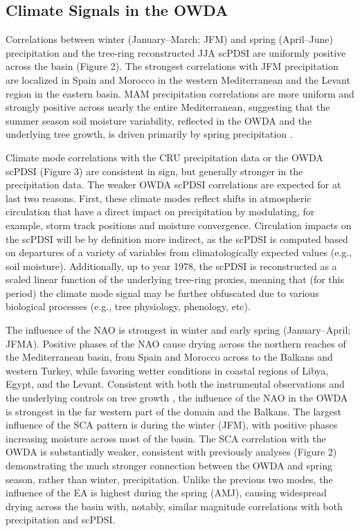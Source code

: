 \documentclass[draft,jgr]{AGUTeX}
\begin{document}
\begin{article}
\subsection{Climate Signals in the OWDA}
\noindent Correlations between winter (January--March; JFM) and spring (April--June) precipitation and the tree-ring reconstructed JJA scPDSI are uniformly positive across the basin (Figure 2). The strongest correlations with JFM precipitation are localized in Spain and Morocco in the western Mediterranean and the Levant region in the eastern basin.  MAM precipitation correlations are more uniform and strongly positive across nearly the entire Mediterranean, suggesting that the summer season soil moisture variability, reflected in the OWDA and the underlying tree growth, is driven primarily by spring precipitation \citep[c.f.][]{Touchan:etal2014a}.

\indent Climate mode correlations with the CRU precipitation data or the OWDA scPDSI (Figure 3) are consistent in sign, but generally stronger in the precipitation data. The weaker OWDA scPDSI correlations are expected for at last two reasons. First, these climate modes reflect shifts in atmospheric circulation that have a direct impact on precipitation by modulating, for example, storm track positions and moisture convergence. Circulation impacts on the scPDSI will be by definition more indirect, as the scPDSI is computed based on departures of a variety of variables from climatologically expected values (e.g., soil moisture). Additionally, up to year 1978, the scPDSI is reconstructed as a scaled linear function of the underlying tree-ring proxies, meaning that (for this period) the climate mode signal may be further obfuscated due to various biological processes (e.g., tree physiology, phenology, etc).

\indent The influence of the NAO is strongest in winter and early spring (January--April; JFMA). Positive phases of the NAO cause drying across the northern reaches of the Mediterranean basin, from Spain and Morocco across to the Balkans and western Turkey, while favoring wetter conditions in coastal regions of Libya, Egypt, and the Levant.  Consistent with both the instrumental observations \citep[e.g.][]{Lamb:etal1997,Knippertz:etal2003} and the underlying controls on tree growth \citep{Touchan:etal2008a,Touchan:etal2008b,Panayotov:etal2010}, the influence of the NAO in the OWDA is strongest in the far western part of the domain and the Balkans. The largest influence of the SCA pattern is during the winter (JFM), with positive phases increasing moisture across most of the basin. The SCA correlation with the OWDA is substantially weaker, consistent with previously analyses (Figure 2) demonstrating the much stronger connection between the OWDA and spring season, rather than winter, precipitation. Unlike the previous two modes, the influence of the EA is highest during the spring (AMJ), causing widespread drying across the basin with, notably, similar magnitude correlations with both precipitation and scPDSI.


\end{article}
\end{document}
